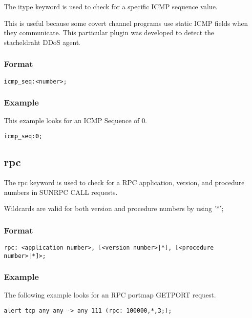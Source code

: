 \documentclass[english]{report}
\begin{document}
The itype keyword is used to check for a specific ICMP sequence value.

This is useful because some covert channel programs use static ICMP fields when
they communicate.  This particular plugin was developed to detect the
stacheldraht DDoS agent.

\subsubsection{Format}

\begin{verbatim}
icmp_seq:<number>;
\end{verbatim}

\subsubsection{Example}

This example looks for an ICMP Sequence of 0.
\begin{verbatim}
icmp_seq:0;
\end{verbatim}

\subsection{rpc}

The rpc keyword is used to check for a RPC application, version, and procedure numbers in SUNRPC CALL requests.

Wildcards are valid for both version and procedure numbers by using '*';

\subsubsection{Format}

\begin{verbatim}
rpc: <application number>, [<version number>|*], [<procedure number>|*]>;
\end{verbatim}

\subsubsection{Example}

The following example looks for an RPC portmap GETPORT request.

\begin{verbatim}
alert tcp any any -> any 111 (rpc: 100000,*,3;);
\end{verbatim}
\end{document}
